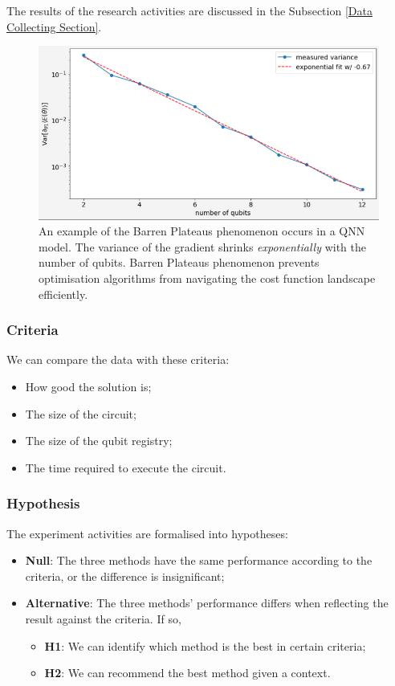 The results of the research activities are discussed in the Subsection \ref{Data Collecting Section}.

\label{Research Activities section}
\begin{figure}
    \includegraphics[width=\textwidth]{./ResearchDesign/Appendices/VarianceShrinking.png}
    \caption{
        An example of the Barren Plateaus phenomenon occurs in a QNN model.
        The variance of the gradient shrinks \textit{exponentially} with the number of qubits.
        Barren Plateaus phenomenon prevents optimisation algorithms from navigating the cost function landscape efficiently.
    }
    \label{Variance Shrinking demo}
\end{figure}


\subsubsection{Criteria}
\label{Criteria section}
We can compare the data with these criteria:
\begin{itemize}
    \item How good the solution is;
    \item The size of the circuit;
    \item The size of the qubit registry;
    \item The time required to execute the circuit.
\end{itemize}

\subsubsection{Hypothesis}
The experiment activities are formalised into hypotheses:
\begin{itemize}
    \item \textbf{Null}: The three methods have the same performance according to the criteria, or the difference is insignificant;
    \item \textbf{Alternative}: The three methods' performance differs when reflecting the result against the criteria. If so,
          \begin{itemize}
              \item \textbf{H1}: We can identify which method is the best in certain criteria;
              \item \textbf{H2}: We can recommend the best method given a context.
          \end{itemize}
\end{itemize}

